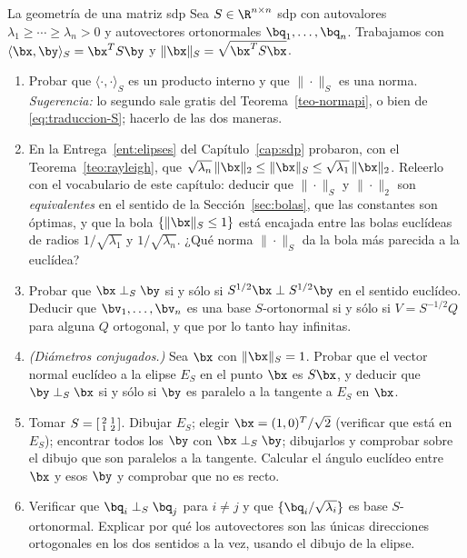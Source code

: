 \begin{entrega}{La geometría de una matriz sdp}\label{ent:geometria-S}
Sea $S\in\R^{n\times n}$ sdp con autovalores
$\lambda_1\ge\cdots\ge\lambda_n>0$ y autovectores ortonormales
$\bq_1,\dots,\bq_n$. Trabajamos con
$\langle\bx,\by\rangle_S=\bx^TS\by$ y $\|\bx\|_S=\sqrt{\bx^TS\bx}$.

\begin{enumerate}[label=\textbf{(\alph*)},itemsep=3pt,topsep=4pt]
\item Probar que $\langle\cdot,\cdot\rangle_S$ es un producto interno y que
$\|\cdot\|_S$ es una norma. \emph{Sugerencia:} lo segundo sale gratis del
Teorema~\ref{teo-normapi}, o bien de \eqref{eq:traduccion-S}; hacerlo de las
dos maneras.

\item En la Entrega~\ref{ent:elipses} del Capítulo~\ref{cap:sdp} probaron,
con el Teorema~\ref{teo:rayleigh}, que
$\sqrt{\lambda_n}\,\|\bx\|_2\le\|\bx\|_S\le\sqrt{\lambda_1}\,\|\bx\|_2$.
Releerlo con el vocabulario de este capítulo: deducir que $\|\cdot\|_S$ y
$\|\cdot\|_2$ son \emph{equivalentes} en el sentido de la
Sección~\ref{sec:bolas}, que las constantes son óptimas, y que la bola
$\{\|\bx\|_S\le1\}$ está encajada entre las bolas euclídeas de radios
$1/\sqrt{\lambda_1}$ y $1/\sqrt{\lambda_n}$. ¿Qué norma $\|\cdot\|_S$ da la
bola más parecida a la euclídea?

\item Probar que $\bx\perp_S\by$ si y sólo si
$S^{1/2}\bx\perp S^{1/2}\by$ en el sentido euclídeo. Deducir que
$\bv_1,\dots,\bv_n$ es una base $S$-ortonormal si y sólo si
$V=S^{-1/2}Q$ para alguna $Q$ ortogonal, y que por lo tanto hay infinitas.

\item \emph{(Diámetros conjugados.)} Sea $\bx$ con $\|\bx\|_S=1$. Probar que
el vector normal euclídeo a la elipse $E_S$ en el punto $\bx$ es $S\bx$, y
deducir que $\by\perp_S\bx$ si y sólo si $\by$ es paralelo a la tangente a
$E_S$ en $\bx$.

\item Tomar $S=\begin{bsmallmatrix}2&1\\ 1&2\end{bsmallmatrix}$. Dibujar
$E_S$; elegir $\bx=(1,0)^T/\sqrt2$ (verificar que está en $E_S$); encontrar
todos los $\by$ con $\bx\perp_S\by$; dibujarlos y comprobar sobre el dibujo
que son paralelos a la tangente. Calcular el ángulo euclídeo entre $\bx$ y
esos $\by$ y comprobar que no es recto.

\item Verificar que $\bq_i\perp_S\bq_j$ para $i\neq j$ y que
$\{\bq_i/\sqrt{\lambda_i}\}$ es base $S$-ortonormal. Explicar por qué los
autovectores son las únicas direcciones ortogonales en los dos sentidos a la
vez, usando el dibujo de la elipse.

\end{enumerate}

\medskip
{}
\end{entrega}

